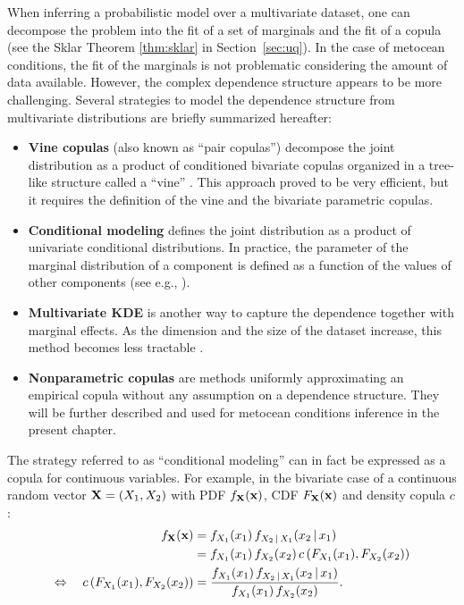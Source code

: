 When inferring a probabilistic model over a multivariate dataset, one can decompose the problem into the fit of a set of marginals and the fit of a copula (see the Sklar Theorem \ref{thm:sklar} in Section~\ref{sec:uq}). 
In the case of metocean conditions, the fit of the marginals is not problematic considering the amount of data available. 
However, the complex dependence structure appears to be more challenging. 
Several strategies to model the dependence structure from multivariate distributions are briefly summarized hereafter: 
\begin{itemize}
    \item \textbf{Vine copulas} (also known as ``pair copulas'') decompose the joint distribution as a product of conditioned bivariate copulas organized in a tree-like structure called a ``vine'' \citep{joe2011dependence}. 
    This approach proved to be very efficient, but it requires the definition of the vine and the bivariate parametric copulas. 
    \item \textbf{Conditional modeling} defines the joint distribution as a product of univariate conditional distributions. 
    In practice, the parameter of the marginal distribution of a component is defined as a function of the values of other components (see e.g., \citealp{vanem_fekhari_2023}). 
    \item \textbf{Multivariate KDE} is another way to capture the dependence together with marginal effects. As the dimension and the size of the dataset increase, this method becomes less tractable \citep{wand_jones_1994_kde}.  
    \item \textbf{Nonparametric copulas} are methods uniformly approximating an empirical copula without any assumption on a dependence structure. They will be further described and used for metocean conditions inference in the present chapter.    
\end{itemize}

\medskip
\begin{remark}
    The strategy referred to as ``conditional modeling'' can in fact be expressed as a copula \citep{vanem_2016} for continuous variables. For example, in the bivariate case of a continuous random vector ${\bf X} = (X_1, X_2)$ with PDF $f_{\bf X}({\bf x})$, CDF $F_{\bf X}({\bf x})$ and density copula $c$: 
    \begin{subequations}
        \begin{align}
            f_{\bf X}({\bf x}) &= f_{X_1}(x_1) \, f_{X_2\, |\, X_1}(x_2\, |\, x_1) \\
                       &= f_{X_1}(x_1) \, f_{X_2}(x_2) \, c\left(F_{X_1}(x_1), F_{X_2}(x_2)\right)\\
            \Leftrightarrow \quad c\left(F_{X_1}(x_1), F_{X_2}(x_2)\right) &= \frac{f_{X_1}(x_1) \, f_{X_2\, |\, X_1}(x_2\, |\, x_1)}{f_{X_1}(x_1) \, f_{X_2}(x_2)}.
        \end{align}  
    \end{subequations}
\end{remark}
\medskip

